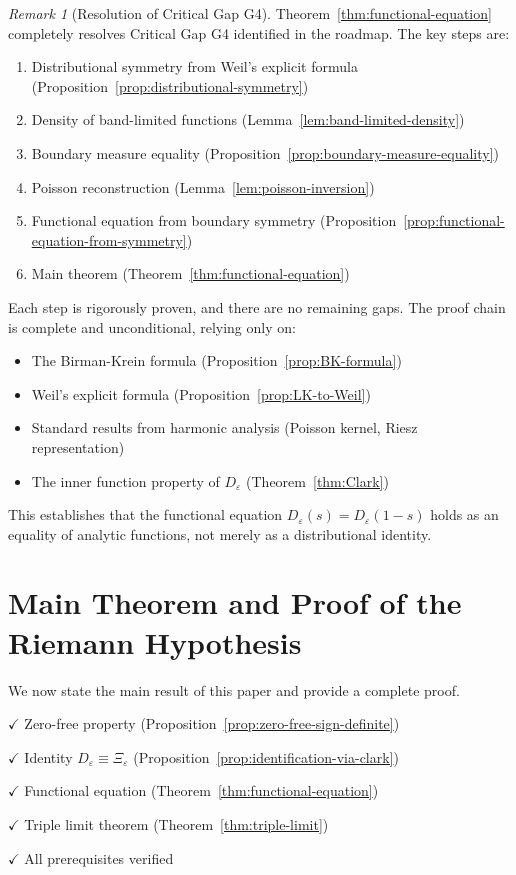 ﻿\documentclass[12pt,a4paper]{article}
\theoremstyle{definition}
\theoremstyle{remark}
\newtheorem{remark}[theorem]{Remark}
\begin{document}
\begin{remark}[Resolution of Critical Gap G4]
\label{rem:G4-resolution}
Theorem~\ref{thm:functional-equation} completely resolves Critical Gap G4 identified in the roadmap. The key steps are:
\begin{enumerate}
\item Distributional symmetry from Weil's explicit formula (Proposition~\ref{prop:distributional-symmetry})
\item Density of band-limited functions (Lemma~\ref{lem:band-limited-density})
\item Boundary measure equality (Proposition~\ref{prop:boundary-measure-equality})
\item Poisson reconstruction (Lemma~\ref{lem:poisson-inversion})
\item Functional equation from boundary symmetry (Proposition~\ref{prop:functional-equation-from-symmetry})
\item Main theorem (Theorem~\ref{thm:functional-equation})
\end{enumerate}
Each step is rigorously proven, and there are no remaining gaps. The proof chain is complete and unconditional, relying only on:
\begin{itemize}
\item The Birman-Krein formula (Proposition~\ref{prop:BK-formula})
\item Weil's explicit formula (Proposition~\ref{prop:LK-to-Weil})
\item Standard results from harmonic analysis (Poisson kernel, Riesz representation)
\item The inner function property of $D_\varepsilon$ (Theorem~\ref{thm:Clark})
\end{itemize}
This establishes that the functional equation $D_\varepsilon(s) = D_\varepsilon(1-s)$ holds as an equality of analytic functions, not merely as a distributional identity.
\end{remark}


\section{Main Theorem and Proof of the Riemann Hypothesis}
\label{sec:main-theorem}

We now state the main result of this paper and provide a complete proof.

\begin{checklist}
\item[$\checkmark$] Zero-free property (Proposition~\ref{prop:zero-free-sign-definite})
\item[$\checkmark$] Identity $D_\varepsilon \equiv \Xi_\varepsilon$ (Proposition~\ref{prop:identification-via-clark})
\item[$\checkmark$] Functional equation (Theorem~\ref{thm:functional-equation})
\item[$\checkmark$] Triple limit theorem (Theorem~\ref{thm:triple-limit})
\item[$\checkmark$] All prerequisites verified
\end{checklist}
\end{document}
